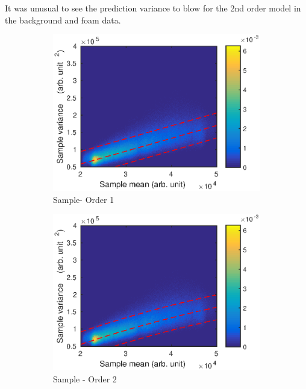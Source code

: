 \documentclass[12pt]{report}
\begin{document}
It was unusual to see the prediction variance to blow for the 2nd order model in the background and foam data.

\begin{figure}
	\centering
	\begin{subfigure}{0.45\textwidth}
		\includegraphics[width=\textwidth]{figures/meanVar/subsample_sample1.eps}
		\caption{Sample- Order 1}
	\end{subfigure}
	\begin{subfigure}{0.45\textwidth}
		\includegraphics[width=\textwidth]{figures/meanVar/subsample_sample2.eps}
		\caption{Sample - Order 2}
	\end{subfigure}
	\begin{subfigure}{0.45\textwidth}

\end{subfigure}
\end{figure}
\end{document}
